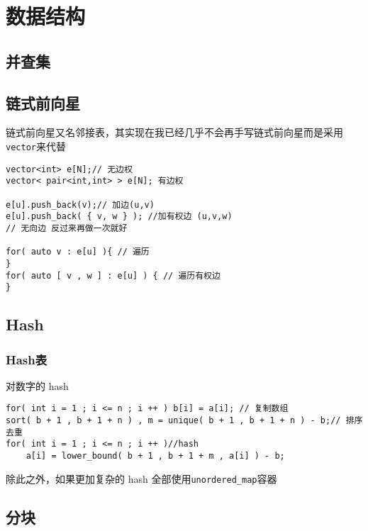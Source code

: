 \chapter{数据结构}

\section{并查集}



\section{链式前向星}
链式前向星又名邻接表，其实现在我已经几乎不会再手写链式前向星而是采用\verb|vector|来代替
\begin{lstlisting}
vector<int> e[N];// 无边权
vector< pair<int,int> > e[N]; 有边权

e[u].push_back(v);// 加边(u,v)
e[u].push_back( { v, w } ); //加有权边 (u,v,w)
// 无向边 反过来再做一次就好

for( auto v : e[u] ){ // 遍历
}
for( auto [ v , w ] : e[u] ) { // 遍历有权边
}

\end{lstlisting}

\section{Hash}
\subsection{Hash表}
对数字的 hash
\begin{lstlisting}
for( int i = 1 ; i <= n ; i ++ ) b[i] = a[i]; // 复制数组
sort( b + 1 , b + 1 + n ) , m = unique( b + 1 , b + 1 + n ) - b;// 排序去重
for( int i = 1 ; i <= n ; i ++ )//hash
    a[i] = lower_bound( b + 1 , b + 1 + m , a[i] ) - b;
\end{lstlisting}
除此之外，如果更加复杂的 hash 全部使用\verb|unordered_map|容器







\section{分块}


